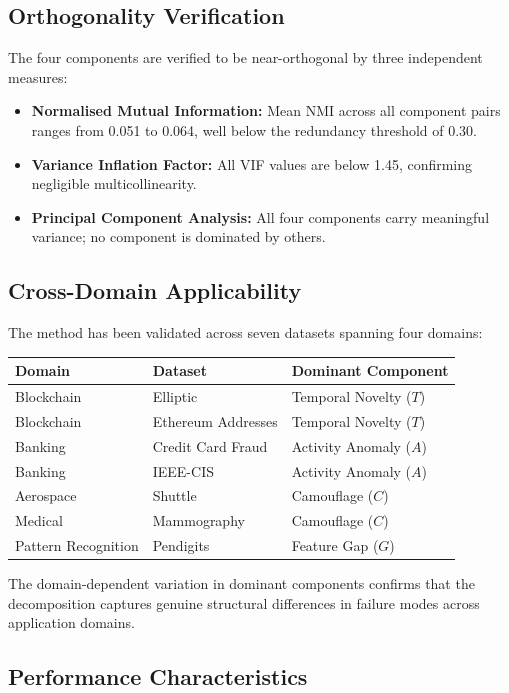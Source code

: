 \documentclass[12pt,a4paper]{article}
\begin{document}
\subsection{Orthogonality Verification}

The four components are verified to be near-orthogonal by three independent 
measures:
\begin{itemize}
\item \textbf{Normalised Mutual Information:} Mean NMI across all component 
pairs ranges from 0.051 to 0.064, well below the redundancy threshold of 
0.30.
\item \textbf{Variance Inflation Factor:} All VIF values are below 1.45, 
confirming negligible multicollinearity.
\item \textbf{Principal Component Analysis:} All four components carry 
meaningful variance; no component is dominated by others.
\end{itemize}

\subsection{Cross-Domain Applicability}

The method has been validated across seven datasets spanning four domains:
\begin{center}
\begin{tabular}{lll}
\toprule
\textbf{Domain} & \textbf{Dataset} & \textbf{Dominant Component} \\
\midrule
Blockchain & Elliptic & Temporal Novelty ($T$) \\
Blockchain & Ethereum Addresses & Temporal Novelty ($T$) \\
Banking & Credit Card Fraud & Activity Anomaly ($A$) \\
Banking & IEEE-CIS & Activity Anomaly ($A$) \\
Aerospace & Shuttle & Camouflage ($C$) \\
Medical & Mammography & Camouflage ($C$) \\
Pattern Recognition & Pendigits & Feature Gap ($G$) \\
\bottomrule
\end{tabular}
\end{center}

The domain-dependent variation in dominant components confirms that the 
decomposition captures genuine structural differences in failure modes 
across application domains.

\subsection{Performance Characteristics}
\end{document}
